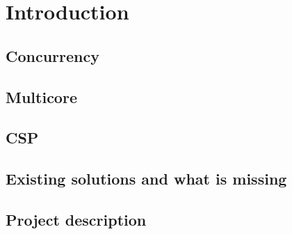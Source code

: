 
\chapter{Introduction}

\section{Concurrency}
\section{Multicore}
\section{CSP}
\section{Existing solutions and what is missing}
\section{Project description}

